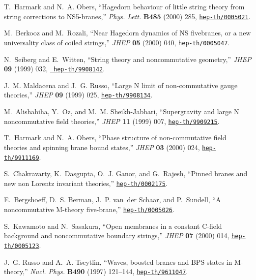 \documentclass[a4paper,twoside,titlepage,12pt]{article}
\begin{document}
\begin{thebibliography}{10}
T.~Harmark and N.~A. Obers, ``Hagedorn behaviour of little string theory from
  string corrections to {NS5-branes},'' {\em Phys. Lett.} {\bf B485} (2000)
  285, \href{http://xxx.lanl.gov/abs/hep-th/0005021}{{\tt hep-th/0005021}}.

M.~Berkooz and M.~Rozali, ``Near {Hagedorn} dynamics of {NS} fivebranes, or a
  new universality class of coiled strings,'' {\em JHEP} {\bf 05} (2000) 040,
  \href{http://xxx.lanl.gov/abs/hep-th/0005047}{{\tt hep-th/0005047}}.

N.~Seiberg and E.~Witten, ``String theory and noncommutative geometry,'' {\em
  JHEP} {\bf 09} (1999) 032, \href{http://xxx.lanl.gov/abs/hep-th/9908142}{{\tt
  hep-th/9908142}}.

J.~M. Maldacena and J.~G. Russo, ``Large {N} limit of non-commutative gauge
  theories,'' {\em JHEP} {\bf 09} (1999) 025,
  \href{http://xxx.lanl.gov/abs/hep-th/9908134}{{\tt hep-th/9908134}}.

M.~Alishahiha, Y.~Oz, and M.~M. Sheikh-Jabbari, ``Supergravity and large {N}
  noncommutative field theories,'' {\em JHEP} {\bf 11} (1999) 007,
  \href{http://xxx.lanl.gov/abs/hep-th/9909215}{{\tt hep-th/9909215}}.

T.~Harmark and N.~A. Obers, ``Phase structure of non-commutative field theories
  and spinning brane bound states,'' {\em JHEP} {\bf 03} (2000) 024,
  \href{http://xxx.lanl.gov/abs/hep-th/9911169}{{\tt hep-th/9911169}}.

S.~Chakravarty, K.~Dasgupta, O.~J. Ganor, and G.~Rajesh, ``Pinned branes and
  new non {Lorentz} invariant theories,''
  \href{http://xxx.lanl.gov/abs/hep-th/0002175}{{\tt hep-th/0002175}}.

E.~Bergshoeff, D.~S. Berman, J.~P. van~der Schaar, and P.~Sundell, ``A
  noncommutative {M-theory} five-brane,''
  \href{http://xxx.lanl.gov/abs/hep-th/0005026}{{\tt hep-th/0005026}}.

S.~Kawamoto and N.~Sasakura, ``Open membranes in a constant {C-field}
  background and noncommutative boundary strings,'' {\em JHEP} {\bf 07} (2000)
  014, \href{http://xxx.lanl.gov/abs/hep-th/0005123}{{\tt hep-th/0005123}}.

J.~G. Russo and A.~A. Tseytlin, ``Waves, boosted branes and {BPS} states in
  {M}-theory,'' {\em Nucl. Phys.} {\bf B490} (1997) 121--144,
  \href{http://xxx.lanl.gov/abs/hep-th/9611047}{{\tt hep-th/9611047}}.


\end{thebibliography}
\end{document}
